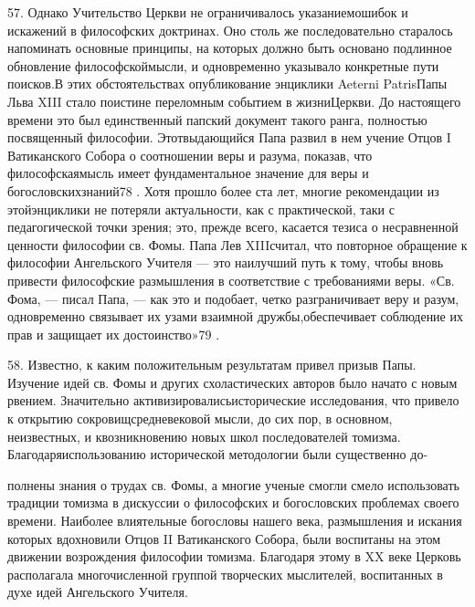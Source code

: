 \documentclass[a5paper,10pt]{article}
\begin{document}
57. Однако Учительство Церкви не ограничивалось указаниемошибок и искажений в
философских доктринах. Оно столь же последовательно старалось напоминать
основные принципы, на которых должно быть основано подлинное обновление
философскоймысли, и одновременно указывало конкретные пути поисков.В этих
обстоятельствах опубликование энциклики Aeterni PatrisПапы Льва XIII стало
поистине переломным событием в жизниЦеркви. До настоящего времени это был
единственный папский документ такого ранга, полностью посвященный философии.
Этотвыдающийся Папа развил в нем учение Отцов I Ватиканского Собора о
соотношении веры и разума, показав, что философскаямысль имеет фундаментальное
значение для веры и богословскихзнаний78 . Хотя прошло более ста лет, многие
рекомендации из этойэнциклики не потеряли актуальности, как с практической,
таки с педагогической точки зрения; это, прежде всего, касается тезиса о
несравненной ценности философии св. Фомы. Папа Лев XIIIсчитал, что повторное
обращение к философии Ангельского Учителя — это наилучший путь к тому, чтобы
вновь привести философские размышления в соответствие с требованиями веры. «Св.
Фома, — писал Папа, — как это и подобает, четко разграничивает веру и разум,
одновременно связывает их узами взаимной дружбы,обеспечивает соблюдение их прав
и защищает их достоинство»79 .

58. Известно, к каким положительным результатам привел призыв Папы. Изучение
идей св. Фомы и других схоластических авторов было начато с новым рвением.
Значительно активизировалисьисторические исследования, что привело к открытию
сокровищсредневековой мысли, до сих пор, в основном, неизвестных, и
квозникновению новых школ последователей томизма. Благодаряиспользованию
исторической методологии были существенно до-

полнены знания о трудах св. Фомы, а многие ученые смогли смело использовать
традиции томизма в дискуссии о философских и богословских проблемах своего
времени. Наиболее влиятельные богословы нашего века, размышления и искания
которых вдохновили Отцов II Ватиканского Собора, были воспитаны на этом
движении возрождения философии томизма. Благодаря этому в XX веке Церковь
располагала многочисленной группой творческих мыслителей, воспитанных в духе
идей Ангельского Учителя.
\end{document}

